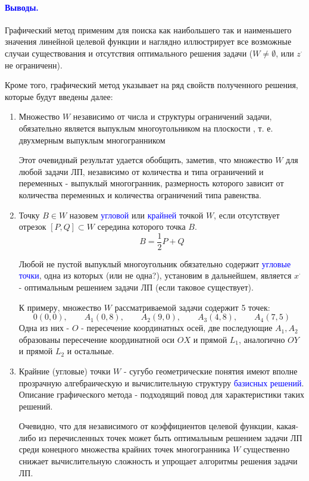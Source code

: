 \documentclass[14pt, letterpaper]{article}
\begin{document}
\paragraph{\textcolor{blue}{Выводы.}}

Графический метод применим для поиска как наибольшего так и наименьшего значения линейной целевой функции и наглядно иллюстрирует все возможные случаи существования и отсутствия оптимального решения задачи ($W \neq \emptyset$, или $z^{ \cdot }$ не ограниченн).

Кроме того, графический метод указывает на ряд свойств полученного решения, которые будут введены далее:
\begin{enumerate}
    \item Множество $W$ независимо от числа и структуры ограничений задачи, обязательно является выпуклым многоугольником на плоскости , т. е. двухмерным выпуклым многогранником  

    Этот очевидный результат удается обобщить, заметив, что множество $W$ для любой задачи ЛП, независимо от количества и типа  ограничений и переменных - выпуклый многогранник, размерность которого зависит от количества переменных и количества ограничений типа равенства.
    
    \item Точку $B \in W$ назовем \textcolor{blue}{угловой} или \textcolor{blue}{крайней} точкой $W$, если отсутствует отрезок $[P, Q] \subset W$ середина которого точка $B$.
    $$ B = \frac{1}{2}P + Q$$

    Любой не пустой выпуклый многоугольник обязательно содержит \textcolor{blue}{угловые точки}, одна из которых (или не одна?), установим в дальнейшем, является $x^{ \cdot }$ - оптимальным решением задачи ЛП (если таковое существует).

    К примеру, множество $W$ рассматриваемой задачи содержит 5 точек:
    $$0(0, 0),\qquad A_{1}(0, 8),\qquad A_{2}(9, 0),\qquad A_{3}(4, 8),\qquad A_{4}(7, 5)$$
    Одна из них - $O$ - пересечение координатных осей, две последующие $A_{1}, A_{2}$ образованы пересечение координатной оси $OX$ и прямой $L_{1}$, аналогично $OY$ и прямой $L_{2}$ и остальные.
    
    \item Крайние (угловые) точки $W$ - сугубо геометрические понятия имеют вполне прозрачную алгебраическую и вычислительную структуру \textcolor{blue}{базисных решений}. Описание графического метода - подходящий повод для характеристики таких решений.

    Очевидно, что для независимого от коэффициентов целевой функции, какая-либо из перечисленных точек может быть оптимальным решением задачи ЛП среди конецного множества крайних точек многогранника $W$ существенно снижает вычислительную сложность и упрощает алгоритмы решения задачи ЛП.


\end{enumerate}
\end{document}

